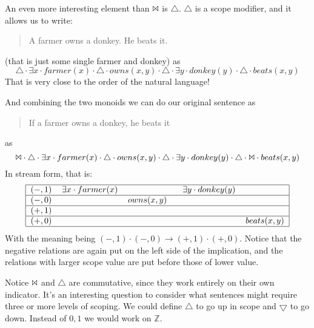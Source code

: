\documentclass[12pt]{article}
\begin{document}
An even more interesting element than $\Bowtie$ is $\triangle$. $\triangle$ is a scope modifier, and it allows us to write:
%
\begin{quote}
A farmer owns a donkey. He beats it.
\end{quote}
%
(that is just some single farmer and donkey) as
%
\begin{equation}
\triangle \cdot \exists x \cdot farmer(x) \cdot \triangle \cdot owns(x,y) \cdot \triangle \cdot \exists y \cdot donkey(y) \cdot \triangle \cdot beats(x,y)
\end{equation}
%
That is very close to the order of the natural language!

And combining the two monoids we can do our original sentence as
%
\begin{quote}
If a farmer owns a donkey, he beats it
\end{quote}
%
as
\begin{equation}
\Bowtie \cdot \triangle \cdot \exists x \cdot farmer(x) \cdot \triangle \cdot owns(x,y) \cdot \triangle \cdot \exists y \cdot donkey(y) \cdot \triangle \cdot \Bowtie \cdot beats(x,y)
\end{equation}
%
In stream form, that is:
%
\begin{equation}
\begin{tabular}{|cllll|}
    \hline
    $(-,1)$ & $\exists x \cdot farmer(x)$ & ~ & ~ $ \exists y \cdot donkey(y)$ & ~ \\\hline
    $(-,0)$ & ~ & $owns(x,y)$ & ~ & ~ \\\hline
    $(+,1)$ & ~ & ~ & ~ & ~ \\\hline
    $(+,0)$ & ~ & ~ & ~ & $beats(x,y)$ \\\hline
\end{tabular}
\end{equation}
%
With the meaning being $(-,1) \cdot (-,0) \rightarrow (+,1) \cdot (+,0)$. Notice that the negative relations are again put on the left side of the implication, and the relations with larger scope value are put before those of lower value.

Notice $\Bowtie$ and $\triangle$ are commutative, since they work entirely on their own indicator. It's an interesting question to consider what sentences might require three or more levels of scoping. We could define $\triangle$ to go up in scope and $\bigtriangledown$ to go down. Instead of ${0,1}$ we would work on $\mathbb{Z}$.
\end{document}
